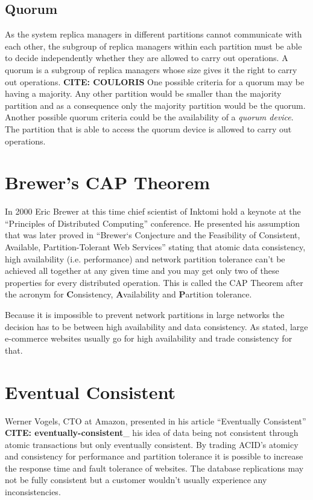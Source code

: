 \subsection{Quorum}

As the system replica managers in different partitions cannot
communicate with each other, the subgroup of replica managers
within each partition must be able to decide independently whether
they are allowed to carry out operations. A quorum is a subgroup of
replica managers whose size gives it the right to carry out
operations. \textbf{CITE: COULORIS} One possible criteria for a
quorum may be having a majority. Any other partition would be
smaller than the majority partition and as a consequence only the
majority partition would be the quorum. Another possible quorum
criteria could be the availability of a \emph{quorum device}. The
partition that is able to access the quorum device is allowed to
carry out operations.

\section{Brewer's CAP Theorem}

In 2000 Eric Brewer at this time chief scientist of Inktomi hold a
keynote at the ``Principles of Distributed Computing'' conference.
He presented his assumption that was later proved in
``Brewer‘s Conjecture and the Feasibility of Consistent, Available, Partition-Tolerant Web Services''
stating that atomic data consistency, high availability (i.e.
performance) and network partition tolerance can't be achieved all
together at any given time and you may get only two of these
properties for every distributed operation. This is called the CAP
Theorem after the acronym for \textbf{C}onsistency,
\textbf{A}vailability and \textbf{P}artition tolerance.

Because it is impossible to prevent network partitions in large
networks the decision has to be between high availability and data
consistency. As stated, large e-commerce websites usually go for
high availability and trade consistency for that.

\section{Eventual Consistent}

Werner Vogels, CTO at Amazon, presented in his article
``Eventually Consistent'' \textbf{CITE: eventually-consistent}\_
his idea of data being not consistent through atomic transactions
but only eventually consistent. By trading ACID's atomicy and
consistency for performance and partition tolerance it is possible
to increase the response time and fault tolerance of websites. The
database replications may not be fully consistent but a customer
wouldn't usually experience any inconsistencies.

